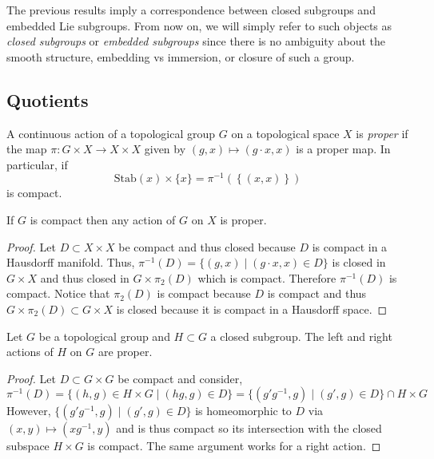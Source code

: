 \documentclass[12pt]{article}
\begin{document}
\begin{rmk}
The previous results imply a correspondence between closed subgroups and embedded Lie subgroups. From now on, we will simply refer to such objects as \textit{closed subgroups} or \textit{embedded subgroups} since there is no ambiguity about the smooth structure, embedding vs immersion, or closure of such a group.
\end{rmk}


\subsection{Quotients}

\begin{definition}
A continuous action of a topological group $G$ on a topological space $X$ is \textit{proper} if the map $\pi : G \times X \to X \times X$ given by $(g, x) \mapsto (g \cdot x, x)$ is a proper map. In particular, if  \[ \mathrm{Stab}(x) \times \{x\} = \pi^{-1}(\left\{(x,x)\right\})\]
is compact. 
\end{definition}

\begin{lemma}
If $G$ is compact then any action of $G$ on $X$ is proper.
\end{lemma}

\begin{proof}
Let $D \subset X \times X$ be compact and thus closed because $D$ is compact in a Hausdorff manifold. Thus, $\pi^{-1}(D) = \{ (g, x) \mid (g \cdot x, x) \in D \}$ is closed in $G \times X$ and thus closed in $G \times \pi_2(D)$ which is compact. Therefore $\pi^{-1}(D)$ is compact. Notice that $\pi_2(D)$ is compact because $D$ is compact and thus $G \times \pi_2(D) \subset G \times X$ is closed because it is compact in a Hausdorff space.
\end{proof}

\begin{proposition} \label{proper_self_actions}
Let $G$ be a topological group and $H \subset G$ a closed subgroup. The left and right actions of $H$ on $G$ are proper.
\end{proposition}

\begin{proof}
Let $D \subset G \times G$ be compact and consider,
\[ \pi^{-1}(D) = \{ (h, g) \in H \times G \mid (hg, g) \in D \} = \{ (g' g^{-1}, g) \mid (g', g) \in D \} \cap H \times G  \]
However, $\{ (g' g^{-1}, g) \mid (g', g) \in D \}$ is homeomorphic to $D$ via $(x,y) \mapsto (xg^{-1}, y)$ and is thus compact so its intersection with the closed subspace $H \times G$ is compact. The same argument works for a right action.
\end{proof}
\end{document}
